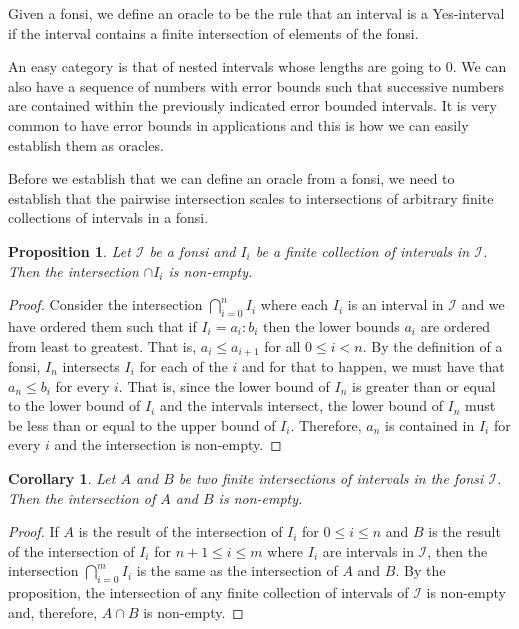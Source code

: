\documentclass[12pt]{article}
\newtheorem{corollary}{Corollary}
\newtheorem{proposition}{Proposition}
\theoremstyle{remark}
\begin{document}
Given a fonsi, we define an oracle to be the rule that an interval is a Yes-interval if the interval contains a finite intersection of elements of the fonsi. 

An easy category is that of nested intervals whose lengths are going to 0. We can also have a sequence of numbers with error bounds such that successive numbers are contained within the previously indicated error bounded intervals.  It is very common to have error bounds in applications and this is how we can easily establish them as oracles. 

Before we establish that we can define an oracle from a fonsi, we need to establish that the pairwise intersection scales to intersections of arbitrary finite collections of  intervals in a fonsi. 

\begin{proposition}
 Let $\mathcal{I}$ be a fonsi and $I_i$ be a finite collection of intervals in $\mathcal{I}$. Then the intersection $\cap I_i$ is non-empty.
\end{proposition}

\begin{proof} 
    Consider the intersection $\bigcap_{i=0}^n I_i$ where each $I_i$ is an interval in $\mathcal{I}$ and we have ordered them such that if $I_i = a_i : b_i$ then the lower bounds $a_i$ are ordered from least to greatest. That is,  $a_i \leq a_{i+1}$ for all $0 \leq i < n$. By the definition of a fonsi, $I_n$ intersects $I_i$ for each of the $i$ and for that to happen, we must have that $a_n \leq b_i$ for every $i$. That is, since the lower bound of $I_n$ is greater than or equal to the lower bound of $I_i$ and the intervals intersect, the lower bound of $I_n$ must be less than or equal to the upper bound of $I_i$. Therefore, $a_n$ is contained in $I_i$ for every $i$ and the intersection is non-empty. 
\end{proof}


\begin{corollary}
Let $A$ and $B$ be two finite intersections of intervals in the fonsi $\mathcal{I}$. Then the intersection of $A$ and $B$ is non-empty.
\end{corollary}

\begin{proof}
    If $A$ is the result of the intersection of $I_i$ for $0 \leq i \leq n$ and $B$ is the result of the intersection of $I_i$ for $n+1 \leq i \leq m$ where $I_i$ are intervals in $\mathcal{I}$, then the intersection $\bigcap_{i=0}^m I_i$ is the same as the intersection of $A$ and $B$. By the proposition, the intersection of any finite collection of intervals of $\mathcal{I}$ is non-empty and, therefore, $A \cap B$ is non-empty. 
\end{proof}
\end{document}

